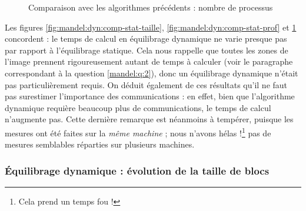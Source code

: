 \begin{figure}
  \centering


  \caption{Comparaison avec les algorithmes précédents : nombre de
    processus}
  \label{fig:mandel:dyn:comp-stat-nproc}
\end{figure}

Les figures \ref{fig:mandel:dyn:comp-stat-taille},
\ref{fig:mandel:dyn:comp-stat-prof} et
\ref{fig:mandel:dyn:comp-stat-nproc} concordent : le temps de calcul
en équilibrage dynamique ne varie presque pas par rapport à
l'équilibrage statique. Cela nous rappelle que toutes les zones de
l'image prennent rigoureusement autant de temps à calculer (voir le
paragraphe correspondant à la question \ref{mandel:q:2}), donc un
équilibrage dynamique n'était pas particulièrement requis. On déduit
également de ces résultats qu'il ne faut pas surestimer l'importance
des communications : en effet, bien que l'algorithme dynamique
requière beaucoup plus de communications, le temps de calcul
n'augmente pas. Cette dernière remarque est néanmoins à tempérer,
puisque les mesures ont été faites sur la \emph{même machine} ; nous
n'avons hélas !\footnote{Cela prend un temps fou !} pas de mesures
semblables réparties sur plusieurs machines.



\subsubsection{Équilibrage dynamique : évolution de la taille de blocs}


